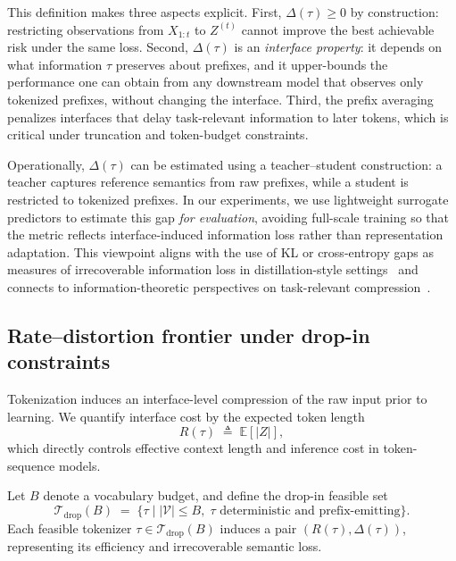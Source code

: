 This definition makes three aspects explicit.
First, $\Delta(\tau)\ge 0$ by construction: restricting observations from $X_{1:t}$ to $Z^{(t)}$ cannot improve
the best achievable risk under the same loss.
Second, $\Delta(\tau)$ is an \emph{interface property}: it depends on what information $\tau$ preserves about
prefixes, and it upper-bounds the performance one can obtain from any downstream model that observes only
tokenized prefixes, without changing the interface.
Third, the prefix averaging penalizes interfaces that delay task-relevant information to later tokens, which is
critical under truncation and token-budget constraints.


Operationally, $\Delta(\tau)$ can be estimated using a teacher--student construction: a teacher captures reference semantics from raw prefixes, while a student is restricted to tokenized prefixes. In our experiments, we use lightweight surrogate predictors to estimate this gap \emph{for evaluation}, avoiding full-scale training so that the metric reflects interface-induced information loss rather than representation adaptation. This viewpoint aligns with the use of KL or cross-entropy gaps as measures of irrecoverable information loss in distillation-style settings~\cite{hinton2015distilling} and connects to information-theoretic perspectives on task-relevant compression~\cite{tishby2000information,cover1999elements}.

\subsection{Rate--distortion frontier under drop-in constraints}
\label{sec:bg_frontier}

Tokenization induces an interface-level compression of the raw input prior to learning.
We quantify interface cost by the expected token length
\begin{equation}
R(\tau) \;\triangleq\; \mathbb{E}[|Z|],
\label{eq:rate_def}
\end{equation}
which directly controls effective context length and inference cost in token-sequence models.

Let $B$ denote a vocabulary budget, and define the drop-in feasible set
\begin{equation}
\mathcal{T}_{\mathrm{drop}}(B)
\;=\;
\big\{
\tau \;\big|\;
|\mathcal{V}| \le B,\;
\tau \text{ deterministic and prefix-emitting}
\big\}.
\label{eq:dropin_set}
\end{equation}
Each feasible tokenizer $\tau \in \mathcal{T}_{\mathrm{drop}}(B)$ induces a pair $(R(\tau), \Delta(\tau))$,
representing its efficiency and irrecoverable semantic loss.

